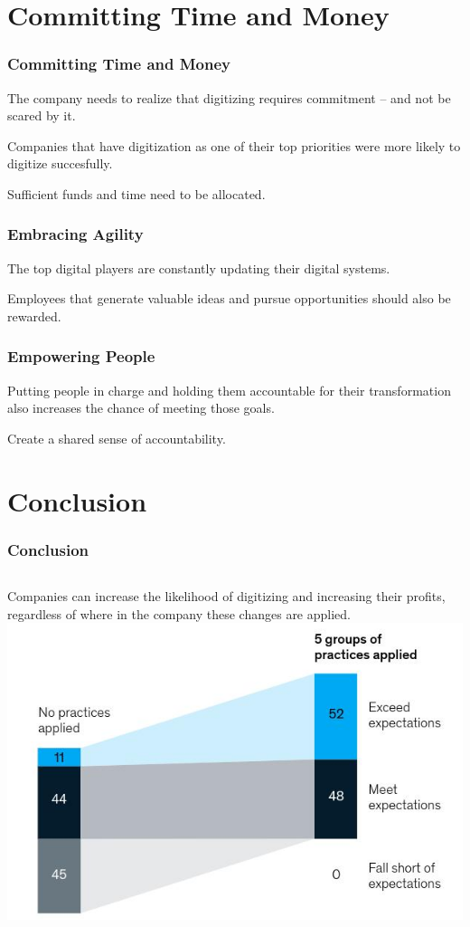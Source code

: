 \documentclass{beamer}
\begin{document}
\section{Committing Time and Money}
\begin{frame}
	\frametitle{Committing Time and Money}
	The company needs to realize that digitizing requires
	commitment -- and not be scared by it.\pause

	Companies that have digitization as one of their top
	priorities were more likely to digitize succesfully.\pause

	Sufficient funds and time need to be allocated.
\end{frame}
\begin{frame}
	\frametitle{Embracing Agility}
	The top digital players are constantly updating their
	digital systems.\pause

	Employees that generate valuable ideas and pursue 
	opportunities should also be rewarded.
\end{frame}
\begin{frame}
	\frametitle{Empowering People}
	Putting people in charge and holding them accountable 
	for their transformation also increases the chance of 
	meeting those goals.\pause

	Create a shared sense of accountability.
\end{frame}
\section{Conclusion}
\begin{frame}
	\frametitle{Conclusion}
	\begin{columns}
	Companies can increase the likelihood of digitizing and 
	increasing their profits, regardless of where in the 
	company these changes are applied.
		\includegraphics[scale=0.2]{profits}
	\end{columns}
\end{frame}
\end{document}
